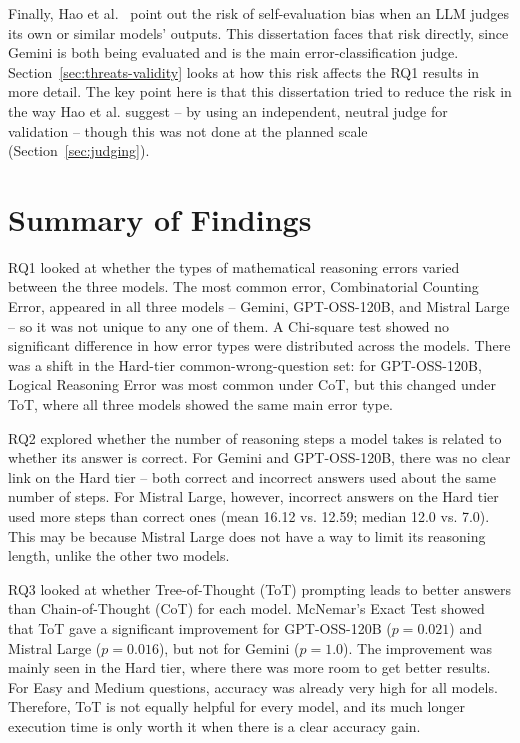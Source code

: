 Finally, Hao et al.~\cite{hao2024autorace} point out the risk of
self-evaluation bias when an LLM judges its own or similar models'
outputs. This dissertation faces that risk directly, since Gemini is
both being evaluated and is the main error-classification judge.
Section~\ref{sec:threats-validity} looks at how this risk affects the
RQ1 results in more detail. The key point here is that this dissertation
tried to reduce the risk in the way Hao et al. suggest -- by using an
independent, neutral judge for validation -- though this was not done at
the planned scale (Section~\ref{sec:judging}).

\section{Summary of Findings}
\label{sec:summary-findings}

RQ1 looked at whether the types of mathematical reasoning errors varied
between the three models. The most common error, Combinatorial Counting
Error, appeared in all three models -- Gemini, GPT-OSS-120B, and Mistral
Large -- so it was not unique to any one of them. A Chi-square test
showed no significant difference in how error types were distributed
across the models. There was a shift in the Hard-tier
common-wrong-question set: for GPT-OSS-120B, Logical Reasoning Error was
most common under CoT, but this changed under ToT, where all three
models showed the same main error type.

RQ2 explored whether the number of reasoning steps a model takes is
related to whether its answer is correct. For Gemini and GPT-OSS-120B,
there was no clear link on the Hard tier -- both correct and incorrect
answers used about the same number of steps. For Mistral Large, however,
incorrect answers on the Hard tier used more steps than correct ones
(mean 16.12 vs. 12.59; median 12.0 vs. 7.0). This may be because Mistral
Large does not have a way to limit its reasoning length, unlike the
other two models.

RQ3 looked at whether Tree-of-Thought (ToT) prompting leads to better
answers than Chain-of-Thought (CoT) for each model. McNemar's Exact Test
showed that ToT gave a significant improvement for GPT-OSS-120B
($p = 0.021$) and Mistral Large ($p = 0.016$), but not for Gemini
($p = 1.0$). The improvement was mainly seen in the Hard tier, where
there was more room to get better results. For Easy and Medium
questions, accuracy was already very high for all models. Therefore, ToT
is not equally helpful for every model, and its much longer execution
time is only worth it when there is a clear accuracy gain.

